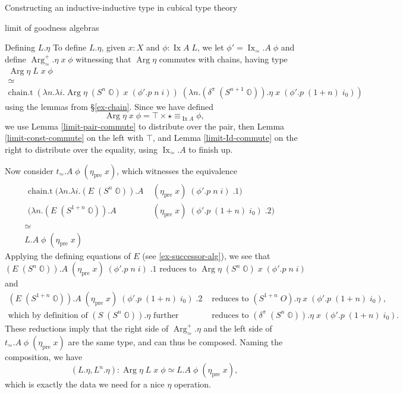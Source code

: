 \documentclass[acmsmall,review]{acmart}\settopmatter{printfolios=true,printccs=false,printacmref=false}
\DeclareMathOperator{\Arg}{Arg}
\DeclareMathOperator{\Ix}{Ix}
\newcommand{\pre}[1]{{#1}_\text{pre}}
\newcommand{\IdA}[3]{{#1}\equiv_{#3}{#2}}
\newcommand{\bbO}{\mathbb{O}}
\begin{document}
\begin{section}{Constructing an inductive-inductive type in cubical type theory}
\begin{subsection}{limit of goodness algebras}
\begin{subsubsection}{Defining $L.\eta$}
To define $L.\eta$, given $x : X$ and $\phi : \Ix A\;L$, we let $\phi' = \Ix_\simeq.A\;\phi$ and define $\Arg_\simeq^+.\eta\;x\;\phi$ witnessing that $\Arg\eta$ commutes with chains, having type
\begin{gather*}
\Arg\eta\;L\;x\;\phi\\
\simeq\\
\text{chain.t}\;(\lambda n.\lambda i.\Arg\eta\;(S^n\;\bbO)\;x\;(\phi'.p\;n\;i))\;(\lambda n.(\delta^\pi\;(S^{n+1}\;\bbO)).\eta\;x\;(\phi'.p\;(1+n)\;i_0))
\end{gather*} using the lemmas from \S\ref{ex-chain}. Since we have defined \[\Arg\eta\;x\;\phi = \top \times \IdA{\star}{\phi}{\Ix A},\] we use Lemma \ref{limit-pair-commute} to distribute over the pair, then Lemma \ref{limit-const-commute} on the left with $\top$, and Lemma \ref{limit-Id-commute} on the right to distribute over the equality, using $\Ix_\simeq.A$ to finish up.

Now consider $t_\simeq.A\;\phi\;(\pre{\eta}\;x)$, which witnesses the equivalence
\begin{gather*}
\begin{align*}
\text{chain.t}\;(\lambda n.\lambda i.(E\;(S^n\;\bbO)).A&\;(\pre{\eta}\;x)\;(\phi'.p\;n\;i)\;.1)&\\(\lambda n.(E\;(S^{1+n}\;\bbO)).A&\;(\pre{\eta}\;x)\;(\phi'.p\;(1+n)\;i_0)\;.2)&
\end{align*}\\
\simeq\\
L.A\;\phi\;(\pre{\eta}\;x)
\end{gather*}
Applying the defining equations of $E$ (see \ref{ex-successor-alg}), we see that
\[(E\;(S^n\;\bbO)).A\;(\pre{\eta}\;x)\;(\phi'.p\;n\;i)\;.1\text{ reduces to } \Arg\eta\;(S^n\;\bbO)\;x\;(\phi'.p\;n\;i)\]
and
\begin{align*}
(E\;(S^{1+n}\;\bbO)).A\;(\pre{\eta}\;x)\;(\phi'.p\;(1+n)\;i_0)\;.2&\text{ reduces to } (S^{1+n}\;O).\eta\;x\;(\phi'.p\;(1+n)\;i_0),\\
\text{which by definition of $(S\;(S^n\;\bbO)).\eta$ further}&\text{ reduces to } (\delta^\pi\;(S^n\;\bbO)).\eta\;x\;(\phi'.p\;(1+n)\;i_0).
\end{align*}
These reductions imply that the right side of $\Arg_\simeq^+.\eta$ and the left side of $t_\simeq.A\;\phi\;(\pre{\eta}\;x)$ are the same type, and can thus be composed. Naming the composition, we have \[(L.\eta, L^n.\eta) : \Arg\eta\;L\;x\;\phi \simeq L.A\;\phi\;(\pre{\eta}\;x),\] which is exactly the data we need for a nice $\eta$ operation.
\end{subsubsection}


\end{subsection}
\end{section}
\end{document}
